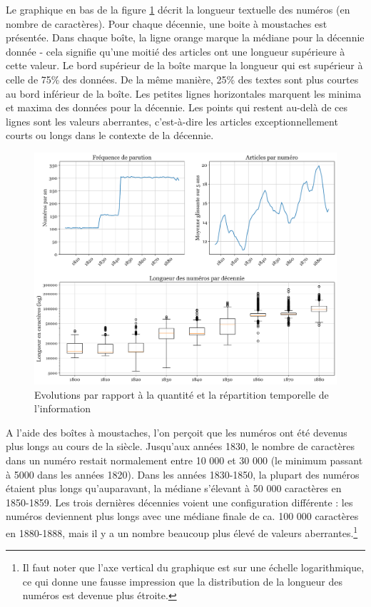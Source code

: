 \documentclass[a4paper,twoside,12pt]{article}
\begin{document}
Le graphique en bas de la figure \ref{fig:text_mass} décrit la longueur textuelle des numéros (en nombre de caractères). Pour chaque décennie, une \og boite à moustaches \fg{} est présentée. Dans chaque boîte, la ligne orange marque la médiane pour la décennie donnée - cela signifie qu'une moitié des articles ont une longueur supérieure à cette valeur. Le bord supérieur de la boîte marque la longueur qui est supérieur à celle de 75\% des données. De la même manière, 25\% des textes sont plus courtes au bord inférieur de la boîte. Les petites lignes horizontales marquent les minima et maxima des données pour la décennie. Les points qui restent au-delà de ces lignes sont les valeurs aberrantes, c'est-à-dire les articles exceptionnellement courts ou longs dans le contexte de la décennie.

\begin{figure}[h]
\centering
\captionsetup{justification=centering}
\includegraphics[width=\textwidth]{images/text_mass.pdf}
\caption{Evolutions par rapport à la quantité et la répartition temporelle de l'information}
\label{fig:text_mass}
\end{figure}

A l'aide des boîtes à moustaches, l'on perçoit que les numéros ont été devenus plus longs au cours de la siècle. Jusqu'aux années 1830, le nombre de caractères dans un numéro restait normalement entre 10 000 et 30 000 (le minimum passant à 5000 dans les années 1820). Dans les années 1830-1850, la plupart des numéros étaient plus longs qu'auparavant, la médiane s'élevant à 50 000 caractères en 1850-1859. Les trois dernières décennies voient une configuration différente : les numéros deviennent plus longs avec une médiane finale de ca. 100 000 caractères en 1880-1888, mais il y a un nombre beaucoup plus élevé de valeurs aberrantes.\footnote{Il faut noter que l'axe vertical du graphique est sur une échelle logarithmique, ce qui donne une fausse impression que la distribution de la longueur des numéros est devenue plus étroite.}
\end{document}
